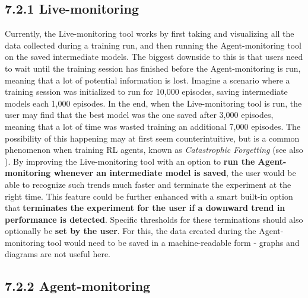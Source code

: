 \subsection*{7.2.1 Live-monitoring}\label{subsec:FutureLiveMonitoring}

Currently, the Live-monitoring tool works by first taking and visualizing all the data collected during a training run, and then running the Agent-monitoring tool on the saved intermediate models. The biggest downside to this is that users need to wait until the training session has finished before the Agent-monitoring is run, meaning that a lot of potential information is lost. Imagine a scenario where a training session was initialized to run for 10,000 episodes, saving intermediate models each 1,000 episodes. In the end, when the Live-monitoring tool is run, the user may find that the best model was the one saved after 3,000 episodes, meaning that a lot of time was wasted training an additional 7,000 episodes. The possibility of this happening may at first seem counterintuitive, but is a common phenomenon when training RL agents, known as \emph{Catastrophic Forgetting} (see also \cite{CatastrophicForgetting}). By improving the Live-monitoring tool with an option to \textbf{run the Agent-monitoring whenever an intermediate model is saved}, the user would be able to recognize such trends much faster and terminate the experiment at the right time. This feature could be further enhanced with a smart built-in option that \textbf{terminates the experiment for the user if a downward trend in performance is detected}. Specific thresholds for these terminations should also optionally be \textbf{set by the user}. For this, the data created during the Agent-monitoring tool would need to be saved in a machine-readable form - graphs and diagrams are not useful here.

\subsection*{7.2.2 Agent-monitoring}\label{subsec:FutureAgentMonitoring}

